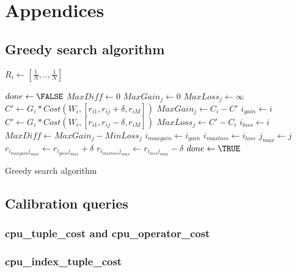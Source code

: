 \chapter{Appendices}

\section{Greedy search algorithm}

\label{sec:greedy}

\begin{algorithm}[H]
 \begin{algorithmic}
	\STATE $R_{i} \gets [\frac{1}{N},..,\frac{1}{N}]$
    \ENDFOR

   \STATE $done \gets \FALSE$
   \REPEAT
	\STATE $MaxDiff \gets 0$
	    \STATE $MaxGain_{j} \gets 0$
	    \STATE $MaxLoss_{j} \gets \infty$
		 \STATE $C' \gets G_{i} * Cost(W_{i},[r_{i1},  r_{ij} + \delta, r_{iM}])$ 
		     \STATE $MaxGain_{j} \gets C_{i} - C'$
		     \STATE $i_{gain} \gets i$
		 \ENDIF
		 \STATE $C' \gets G_{i} * Cost(W_{i},[r_{i1},  r_{ij} - \delta, r_{iM}])$ 
		     \STATE $MaxLoss_{j} \gets C' - C_{i}$
		     \STATE $i_{loss} \gets i$
		 \ENDIF
	    \ENDFOR
	    \STATE {}
		\STATE $MaxDiff \gets MaxGain_{j} - MinLoss_{j}$
		\STATE $i_{maxgain} \gets i_{gain}$
		\STATE $i_{maxloss} \gets i_{loss}$
		\STATE $j_{max} \gets j$
	    \ENDIF
	\ENDFOR
	    \STATE $r_{i_{maxgain}j_{max}} \gets r_{i_{gain}j_{max}} + \delta $
	    \STATE $r_{i_{maxloss}j_{max}} \gets r_{i_{loss}j_{max}} - \delta $
	\ELSE
	    \STATE $done \gets \TRUE$
	\ENDIF

 \end{algorithmic}
  \caption{Greedy search algorithm}
\end{algorithm}


\section{Calibration queries}

\subsection{cpu\_tuple\_cost and cpu\_operator\_cost}
\label{app:cal1}


\subsection{cpu\_index\_tuple\_cost}
\label{app:cal2}

